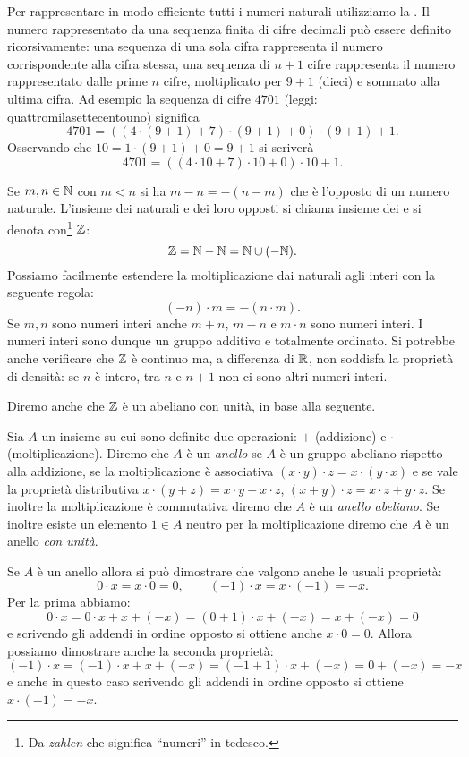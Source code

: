 Per rappresentare in modo efficiente tutti i numeri naturali utilizziamo la 
.
Il numero rappresentato da una sequenza finita di cifre decimali può essere 
definito ricorsivamente: una sequenza di una sola cifra rappresenta il numero 
corrispondente alla cifra stessa, una sequenza di $n+1$ cifre rappresenta il 
numero rappresentato dalle prime $n$ cifre, moltiplicato per $9+1$ (dieci)
e sommato alla ultima cifra. 
Ad esempio la sequenza di cifre $4701$ (leggi: quattromilasettecentouno) significa
\[ 
  4701 = ((4\cdot(9+1)+7)\cdot(9+1)+0)\cdot(9+1)+1.
\]
Osservando che $10=1\cdot (9+1)+0 = 9+1$ si scriverà
\[
  4701 = ((4\cdot 10 + 7)\cdot 10 +0)\cdot 10 + 1.  
\]

Se $m,n\in \mathbb N$ con $m < n$ si ha $m - n = -(n-m)$ che è l'opposto di un numero naturale.
L'insieme dei naturali e dei loro opposti si chiama insieme dei 
 e si denota con\footnote{
Da \emph{zahlen} che significa ``numeri'' in tedesco.
} $\ZZ$:
\index{$\ZZ$}%
\[
  \mathbb Z = \mathbb N - \mathbb N = \mathbb N \cup (-\mathbb N).  
\]
Possiamo facilmente estendere la moltiplicazione dai naturali agli interi 
con la seguente regola:
\[
  (-n)\cdot m = -(n\cdot m).
\]
Se $m,n$ sono numeri interi anche $m+n$, $m-n$ e $m\cdot n$ sono numeri interi.
I numeri interi sono dunque un gruppo additivo e totalmente ordinato.
Si potrebbe anche verificare che $\ZZ$ è continuo
ma, a differenza di $\mathbb R$, non soddisfa la proprietà di densità:
se $n$ è intero, tra $n$ e $n+1$ non ci sono altri numeri interi.

Diremo anche che $\ZZ$ è un  abeliano con unità, in base alla seguente.
%
\begin{definition}[anello]
  Sia $A$ un insieme su cui sono definite due operazioni: $+$ (addizione) e $\cdot$ (moltiplicazione).  
  Diremo che $A$ è un \emph{anello} se $A$ è un gruppo abeliano rispetto alla 
  addizione, 
  se la moltiplicazione è associativa $(x\cdot y)\cdot z = x\cdot (y\cdot x)$ 
  e se vale la proprietà distributiva $x\cdot(y+z) = x\cdot y + x\cdot z$,
  $(x+y)\cdot z = x\cdot z + y\cdot z$.
  Se inoltre la moltiplicazione è commutativa diremo che $A$ è un \emph{anello abeliano}.
  Se inoltre esiste un elemento $1\in A$ neutro per la moltiplicazione 
  diremo che $A$ è un anello \emph{con unità}.
\end{definition}

Se $A$ è un anello allora si può dimostrare che valgono anche le usuali proprietà:
\[
  0\cdot x = x\cdot 0 = 0, \qquad
  (-1)\cdot x = x \cdot (-1) = -x.
\]
Per la prima abbiamo: 
\[
  0\cdot x = 0\cdot x + x + (-x) = (0+1)\cdot x + (-x) = x + (-x) = 0
\]
e scrivendo gli addendi in ordine opposto si ottiene anche $x\cdot 0 = 0$.
Allora possiamo dimostrare anche la seconda proprietà:
\[
   (-1)\cdot x = (-1)\cdot x + x + (-x) = (-1 + 1)\cdot x + (-x) = 0 + (-x) = -x
\]
e anche in questo caso scrivendo gli addendi in ordine opposto si ottiene $x\cdot(-1)=-x$.

